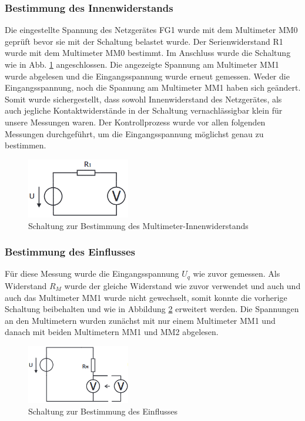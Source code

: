 \documentclass[a4paper]{article}
\begin{document}
\subsubsection*{Bestimmung des Innenwiderstands}
Die eingestellte Spannung des Netzgerätes FG1 wurde mit dem Multimeter MM0 
geprüft bevor sie mit der Schaltung belastet wurde. Der Serienwiderstand R1 wurde
mit dem Multimeter MM0 bestimmt.
Im Anschluss wurde die Schaltung wie in Abb. \ref{fig:1a_RiVM} angeschlossen.
Die angezeigte Spannung am Multimeter MM1 wurde abgelesen und die Eingangsspannung
wurde erneut gemessen. Weder die Eingangsspannung, noch die Spannung am Multimeter
MM1 haben sich geändert. Somit wurde sichergestellt, dass sowohl Innenwiderstand
des Netzgerätes, als auch jegliche Kontaktwiderstände in der Schaltung
vernachlässigbar klein für unsere Messungen waren.\newline
Der Kontrollprozess wurde vor allen folgenden Messungen durchgeführt, um die
Eingangsspannung möglichst genau zu bestimmen.
\begin{figure}[h]
    \centering
    \includegraphics[width=0.4\textwidth]{schematics/1a_RiVM.png}
    \caption{Schaltung zur Bestimmung des Multimeter-Innenwiderstands}
    \label{fig:1a_RiVM}
\end{figure}

\subsubsection*{Bestimmung des Einflusses}
Für diese Messung wurde die Eingangsspannung $U_{q}$ wie zuvor gemessen.
Als Widerstand $R_{M}$ wurde der gleiche Widerstand wie zuvor verwendet und auch
und auch das Multimeter MM1 wurde nicht gewechselt, somit konnte die vorherige
Schaltung beibehalten und wie in Abbildung \ref{fig:1b_EinflussVM} erweitert werden.
Die Spannungen an den Multimetern wurden zunächst mit nur einem Multimeter MM1
und danach mit beiden Multimetern MM1 und MM2 abgelesen.
\begin{figure}[h]
    \centering
    \includegraphics[width=0.4\textwidth]{schematics/1b_EinflussVM.png}
    \caption{Schaltung zur Bestimmung des Einflusses}
    \label{fig:1b_EinflussVM}
\end{figure}
\end{document}
